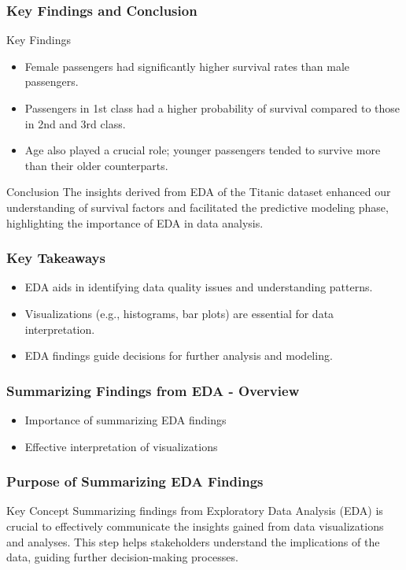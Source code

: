 \documentclass[aspectratio=169]{beamer}
\begin{document}
\begin{frame}[fragile]
    \frametitle{Key Findings and Conclusion}
    \begin{block}{Key Findings}
        \begin{itemize}
            \item Female passengers had significantly higher survival rates than male passengers.
            \item Passengers in 1st class had a higher probability of survival compared to those in 2nd and 3rd class.
            \item Age also played a crucial role; younger passengers tended to survive more than their older counterparts.
        \end{itemize}
    \end{block}
    \begin{block}{Conclusion}
        The insights derived from EDA of the Titanic dataset enhanced our understanding of survival factors and facilitated the predictive modeling phase, highlighting the importance of EDA in data analysis.
    \end{block}
\end{frame}

\begin{frame}[fragile]
    \frametitle{Key Takeaways}
    \begin{itemize}
        \item EDA aids in identifying data quality issues and understanding patterns.
        \item Visualizations (e.g., histograms, bar plots) are essential for data interpretation.
        \item EDA findings guide decisions for further analysis and modeling.
    \end{itemize}
\end{frame}

\begin{frame}[fragile]
    \frametitle{Summarizing Findings from EDA - Overview}
    \begin{itemize}
        \item Importance of summarizing EDA findings
        \item Effective interpretation of visualizations
    \end{itemize}
\end{frame}

\begin{frame}[fragile]
    \frametitle{Purpose of Summarizing EDA Findings}
    \begin{block}{Key Concept}
        Summarizing findings from Exploratory Data Analysis (EDA) is crucial to effectively communicate the insights gained from data visualizations and analyses. This step helps stakeholders understand the implications of the data, guiding further decision-making processes.
    \end{block}
\end{frame}
\end{document}
